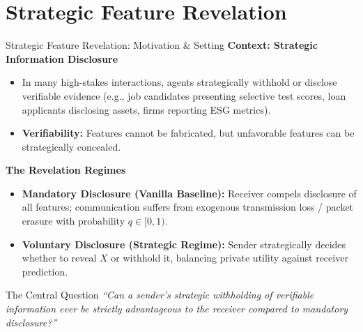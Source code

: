 \documentclass[aspectratio=169, 11pt, t, xcolor=table]{beamer}
\begin{document}
\section{Strategic Feature Revelation}

\begin{frame}{Strategic Feature Revelation: Motivation \& Setting}
\small
\textbf{Context: Strategic Information Disclosure}
\begin{itemize}\itemsep=0.5pt
  \footnotesize
  \item In many high-stakes interactions, agents strategically withhold or disclose verifiable evidence (e.g., job candidates presenting selective test scores, loan applicants disclosing assets, firms reporting ESG metrics).
  \item \textbf{Verifiability:} Features cannot be fabricated, but unfavorable features can be strategically concealed.
\end{itemize}

\vspace{0.1em}
\textbf{The Revelation Regimes}
\begin{itemize}\itemsep=0.5pt
  \footnotesize
  \item \textcolor{IITBNavy}{\textbf{Mandatory Disclosure (Vanilla Baseline):}} Receiver compels disclosure of all features; communication suffers from exogenous transmission loss / packet erasure with probability $q \in [0, 1)$.
  \item \textcolor{IITBGold!80!black}{\textbf{Voluntary Disclosure (Strategic Regime):}} Sender strategically decides whether to reveal $X$ or withhold it, balancing private utility against receiver prediction.
\end{itemize}

\vspace{0.1em}
\begin{alertblock}{The Central Question}
\centering
\emph{``Can a sender's strategic withholding of verifiable information ever be strictly advantageous to the receiver compared to mandatory disclosure?''}
\end{alertblock}
\end{frame}
\end{document}
